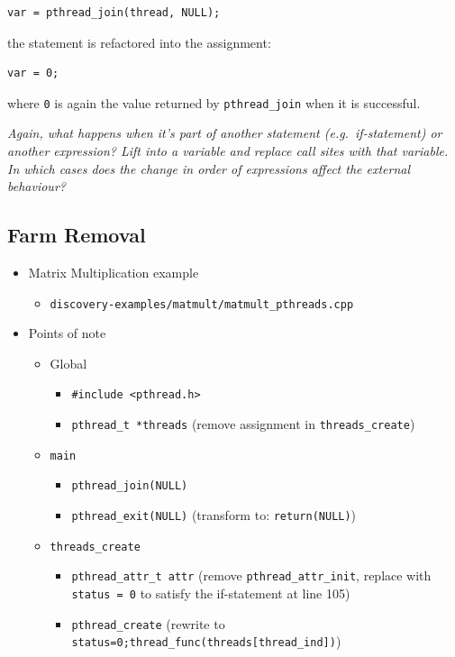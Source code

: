 \begin{lstlisting}[frame=single]
var = pthread_join(thread, NULL);
\end{lstlisting}

\noindent
the statement is refactored into the assignment:

\begin{lstlisting}[frame=single]
var = 0;
\end{lstlisting}

\noindent
where \lstinline|0| is again the value returned by \lstinline|pthread_join| when it is successful. 

\emph{Again, what happens when it's part of another statement (e.g.\ if-statement) or another expression? Lift into a variable and replace call sites with that variable. In which cases does the change in order of expressions affect the external behaviour?}

\subsection{Farm Removal}

\begin{itemize}
\item Matrix Multiplication example
  \begin{itemize}
  \item \texttt{discovery-examples/matmult/matmult\_pthreads.cpp}
  \end{itemize}
\item Points of note
  \begin{itemize}
  \item Global
    \begin{itemize}
    \item \lstinline|#include <pthread.h>|
    \item \lstinline|pthread_t *threads| (remove assignment in \lstinline|threads_create|)
    \end{itemize}
  \item \lstinline|main|
    \begin{itemize}
    \item \lstinline|pthread_join(NULL)|
    \item \lstinline|pthread_exit(NULL)| (transform to: \lstinline|return(NULL)|)
    \end{itemize}
  \item \lstinline|threads_create|
    \begin{itemize}
    \item \lstinline|pthread_attr_t attr| (remove \lstinline|pthread_attr_init|, replace with \lstinline|status = 0| to satisfy the if-statement at line 105)
    \item \lstinline|pthread_create| (rewrite to \lstinline|status=0;thread_func(threads[thread_ind])|)
    \end{itemize}
  \end{itemize}
\end{itemize}

